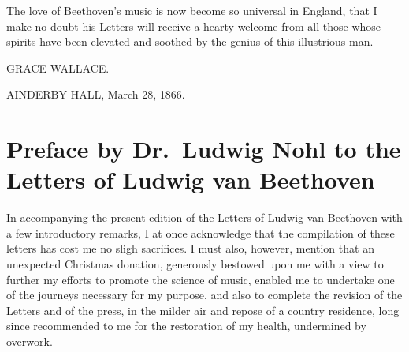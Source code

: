 \documentclass[12pt,oneside]{book}
\begin{document}
The love of Beethoven's music is now become so universal in England, that I make no doubt his Letters will receive a hearty welcome from all those whose spirits have been elevated and soothed by the genius of this illustrious man. \par 
\begin{flushright}
    GRACE WALLACE.
\end{flushright}
AINDERBY HALL, March 28, 1866.
\pagebreak

\chapter{Preface by Dr.~Ludwig Nohl to the Letters of Ludwig van Beethoven}
In accompanying the present edition of the Letters of Ludwig van Beethoven with a few introductory remarks,
I at once acknowledge that the compilation of these letters has cost me no sligh sacrifices.
I must also, however, mention that an unexpected Christmas donation, generously bestowed upon me with a view to further my efforts to promote
the science of music, enabled me to undertake one of the journeys necessary for my purpose, and also to 
complete the revision of the Letters and of the press, in the milder air and repose of a country residence,
long since recommended to me for the restoration of my health, undermined by overwork. \par
\end{document}
